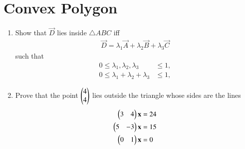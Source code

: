 \documentclass[journal,12pt,twocolumn]{IEEEtran}
\renewcommand\thesection{\arabic{section}}
\begin{document}
\section{Convex Polygon}
\begin{enumerate}[label=\thesection.\arabic*
,ref=\thesection.\theenumi]
\item Show that $\vec{D}$ lies inside $\triangle ABC$ iff
\begin{align}
\vec{D} = \lambda_1\vec{A} + \lambda_2\vec{B} + \lambda_3\vec{C}
\end{align}
such that
\begin{align}
0 \le \lambda_1, \lambda_2, \lambda_3 &\le 1,
\\
0 \le \lambda_1+\lambda_2+\lambda_3 &\le 1,
\end{align}
\item Prove that the point $\begin{pmatrix}4\\4\end{pmatrix}$ lies outside the triangle whose sides are the lines
\begin{align}
\begin{pmatrix}3&4\end{pmatrix} \mathbf{x}&= 24
\\
\begin{pmatrix} 5 & - 3\end{pmatrix} \mathbf{x}&= 15
\\
\begin{pmatrix}0 &1\end{pmatrix} \mathbf{x}&= 0
\end{align}

\end{enumerate}
%
\end{document}
